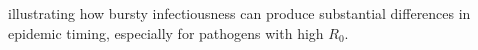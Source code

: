 


 illustrating how bursty infectiousness can produce substantial differences in epidemic timing, especially for pathogens with high $R_0$. 










